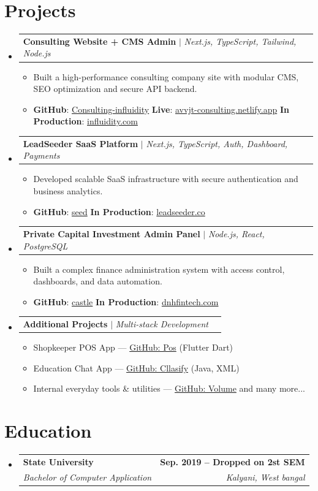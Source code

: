 \documentclass[letterpaper,11pt]{article}
\makeatletter
\newcommand{\resumeItem}[1]{
  \item\small{
    {#1 \vspace{-2pt}}
  }
}
\newcommand{\resumeSubheading}[4]{
  \vspace{-2pt}\item
    \begin{tabular*}{1.0\textwidth}[t]{l@{\extracolsep{\fill}}r}
      \textbf{#1} & \textbf{\small #2} \\
      \textit{\small#3} & \textit{\small #4} \\
    \end{tabular*}\vspace{-7pt}
}
\newcommand{\resumeProjectHeading}[2]{
    \item
    \begin{tabular*}{1.001\textwidth}{l@{\extracolsep{\fill}}r}
      \small#1 & \textbf{\small #2}\\
    \end{tabular*}\vspace{-7pt}
}
\newcommand{\resumeSubHeadingListStart}{\begin{itemize}[leftmargin=0.0in, label={}]}
\newcommand{\resumeSubHeadingListEnd}{\end{itemize}}
\newcommand{\resumeItemListStart}{\begin{itemize}}
\newcommand{\resumeItemListEnd}{\end{itemize}\vspace{-5pt}}
\makeatother
\begin{document}
\section{Projects}
\vspace{-5pt}
\resumeSubHeadingListStart

\resumeProjectHeading
{\textbf{Consulting Website + CMS Admin} $|$ \emph{Next.js, TypeScript, Tailwind, Node.js}}{}
\resumeItemListStart
\resumeItem{Built a high-performance consulting company site with modular CMS, SEO optimization and secure API backend.}
\resumeItem{\textbf{GitHub}: \href{https://github.com/avvjt/Consulting-influidity}{Consulting-influidity} \quad
\textbf{Live}: \href{https://avvjt-consulting.netlify.app/}{avvjt-consulting.netlify.app} \quad
\textbf{In Production}: \href{https://www.influidity.com/}{influidity.com}}
\resumeItemListEnd
\vspace{-9pt}

\resumeProjectHeading
{\textbf{LeadSeeder SaaS Platform} $|$ \emph{Next.js, TypeScript, Auth, Dashboard, Payments}}{}
\resumeItemListStart
\resumeItem{Developed scalable SaaS infrastructure with secure authentication and business analytics.}
\resumeItem{\textbf{GitHub}: \href{https://github.com/avvjt/seed}{seed} \quad
\textbf{In Production}: \href{https://leadseeder.co/}{leadseeder.co}}
\resumeItemListEnd
\vspace{-9pt}

\resumeProjectHeading
{\textbf{Private Capital Investment Admin Panel} $|$ \emph{Node.js, React, PostgreSQL}}{}
\resumeItemListStart
\resumeItem{Built a complex finance administration system with access control, dashboards, and data automation.}
\resumeItem{\textbf{GitHub}: \href{https://github.com/avvjt/castle}{castle} \quad
\textbf{In Production}: \href{https://dnhfintech.com/}{dnhfintech.com}}
\resumeItemListEnd
\vspace{-9pt}

\resumeProjectHeading
{\textbf{Additional Projects} $|$ \emph{Multi-stack Development}}{}
\resumeItemListStart
\resumeItem{Shopkeeper POS App — \href{https://github.com/avvjt/Pos}{GitHub: Pos} (Flutter Dart)}
\resumeItem{Education Chat App — \href{https://github.com/avvjt/Cllasify}{GitHub: Cllasify} (Java, XML)}
\resumeItem{Internal everyday tools & utilities — \href{https://github.com/avvjt/Volume}{GitHub: Volume} and many more...}
\resumeItemListEnd

\resumeSubHeadingListEnd
\vspace{-10pt}
 

\section{Education}
  \resumeSubHeadingListStart
    \resumeSubheading
      {State University}{Sep. 2019 -- Dropped on 2st SEM}
      {Bachelor of Computer Application}{Kalyani, West bangal}
  \resumeSubHeadingListEnd
\end{document}
